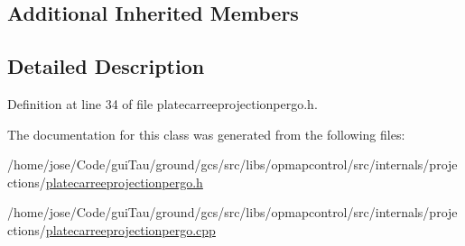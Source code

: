 \subsection*{Additional Inherited Members}


\subsection{Detailed Description}


Definition at line 34 of file platecarreeprojectionpergo.\-h.



The documentation for this class was generated from the following files\-:\begin{DoxyCompactItemize}
\item 
/home/jose/\-Code/gui\-Tau/ground/gcs/src/libs/opmapcontrol/src/internals/projections/\hyperlink{platecarreeprojectionpergo_8h}{platecarreeprojectionpergo.\-h}\item 
/home/jose/\-Code/gui\-Tau/ground/gcs/src/libs/opmapcontrol/src/internals/projections/\hyperlink{platecarreeprojectionpergo_8cpp}{platecarreeprojectionpergo.\-cpp}\end{DoxyCompactItemize}

